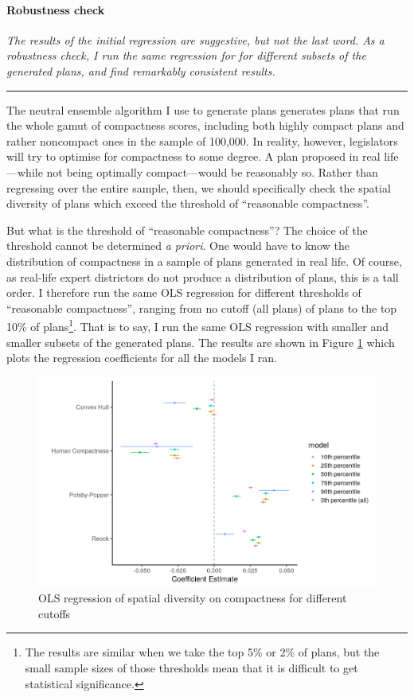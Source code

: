 \documentclass[]{article}
\let\oldparagraph\paragraph
\renewcommand{\paragraph}[1]{\oldparagraph{#1}\mbox{}}
\begin{document}
\hypertarget{robustness-check-1}{%
\paragraph{Robustness check}\label{robustness-check-1}}

\textsl{The results of the initial regression are suggestive, but not the last word. As
a robustness check, I run the same regression for for different subsets of the
generated plans, and find remarkably consistent results.}

\begin{center}\rule{0.5\linewidth}{\linethickness}\end{center}

The neutral ensemble algorithm I use to generate plans generates plans
that run the whole gamut of compactness scores, including both highly
compact plans and rather noncompact ones in the sample of 100,000. In
reality, however, legislators will try to optimise for compactness to
some degree. A plan proposed in real life---while not being optimally
compact---would be reasonably so. Rather than regressing over the entire
sample, then, we should specifically check the spatial diversity of
plans which exceed the threshold of ``reasonable compactness''.

But what is the threshold of ``reasonable compactness''? The choice of
the threshold cannot be determined \emph{a priori}. One would have to
know the distribution of compactness in a sample of plans generated in
real life. Of course, as real-life expert districtors do not produce a
distribution of plans, this is a tall order. I therefore run the same
OLS regression for different thresholds of ``reasonable compactness'',
ranging from no cutoff (all plans) of plans to the top 10\% of
plans\footnote{The results are similar when we take the top 5\% or 2\%
  of plans, but the small sample sizes of those thresholds mean that it
  is difficult to get statistical significance.}. That is to say, I run
the same OLS regression with smaller and smaller subsets of the
generated plans. The results are shown in Figure \ref{cutoffs} which
plots the regression coefficients for all the models I ran.

\begin{figure}
\centering
\includegraphics{../30_results/regression_coefficients_all.png}
\caption{OLS regression of spatial diversity on compactness for
different cutoffs \label{cutoffs}}
\end{figure}
\end{document}
